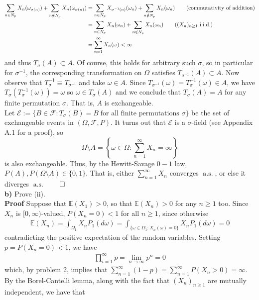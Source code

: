 \documentclass[10pt]{article}
\newcommand{\E}{\mathbb{E}}
\newcommand{\1}[1]{\mathbbm{1}_{#1}}
\newcommand{\mc}[1]{\mathcal{#1}}
\DeclareMathOperator{\as}{a.s.}
\DeclareMathOperator{\iid}{i.i.d.}
\begin{document}
    \begin{align*}
        \sum_{n\in N_p}X_n(\omega_{\sigma(n)})+\sum_{n\notin N_p}X_n(\omega_{\sigma(n)})&=\sum_{n\in N_p}X_{\sigma^{-1}(n)}(\omega_n)+\sum_{n\notin N_p}X_n(\omega_n)\tag{commutativity of addition}\\
        &=\sum_{n\in N_p}X_n(\omega_n)+\sum_{n\notin N_p}X_n(\omega_n)\tag{$(X_n)_{n\geq 1}$ $\iid$}\\
        &=\sum_{n=1}^\infty X_n(\omega)<\infty
    \end{align*}
    and thus $T_\sigma(A)\subset A$. Of course, this holds for arbitrary such $\sigma$, so in particular for $\sigma^{-1}$, the corresponding transformation on $\Omega$ satisfies $T_{\sigma^{-1}}(A)\subset A$. Now observe that $T^{-1}_\sigma\equiv T_{\sigma^{-1}}$ and take $\omega\in A$.
    Since $T_{\sigma^{-1}}(\omega)=T^{-1}_\sigma(\omega)\in A$, we have $T_{\sigma}(T^{-1}_\sigma(\omega))=\omega$ so $\omega\in T_\sigma(A)$ and we conclude that $T_\sigma(A)=A$ for any finite permutation $\sigma$. That is, $A$ is exchangeable.\\[5pt]
    Let $\mc{E}:=\{B\in\mc{F}:T_\sigma(B)=B\;\text{for all finite permutations $\sigma$}\}$ be the set of exchangeable events in $(\Omega,\mc{F},P)$. It turns out that $\mc{E}$ is a $\sigma$-field (see Appendix A.1 for a proof), so 
    \[\Omega\setminus A=\left\{\omega\in\Omega:\sum_{n=1}^\infty X_n=\infty\right\}\]
    is also exchangeable. Thus, by the Hewitt-Savage $0-1$ law, $P(A),P(\Omega\setminus A)\in\{0,1\}$. That is, either $\sum_{n=1}^\infty X_n$ converges $\as$, or else it diverges $\as$\hfill{$\qed$}\\[5pt]
    {\bf b)} Prove (ii).\\[5pt]
    {\bf Proof}\hspace{5pt} Suppose that $\E(X_1)>0$, so that $\E(X_n)>0$ for any $n\geq 1$ too. Since $X_n$ is $[0,\infty)$-valued, $P(X_n=0)<1$ for all $n\geq 1$, since otherwise
    \begin{align*}
        \E(X_n)=\int_{\Omega_1}X_nP_1(d\omega)=\int_{\{\omega\in\Omega_1:X_n(\omega)=0\}}X_nP_1(d\omega)=0
    \end{align*}
    contradicting the positive expectation of the random variables. Setting $p=P(X_n=0)<1$, we have
    \begin{align*}
        \prod_{i=1}^\infty p=\lim_{n\rightarrow\infty}p^n=0
    \end{align*}
    which, by problem 2, implies that $\sum_{n=1}^\infty(1-p)=\sum_{n=1}^\infty P(X_n>0)=\infty$. By the Borel-Cantelli lemma, along with the fact that $(X_n)_{n\geq1}$ are mutually independent, we have that
\end{document}
